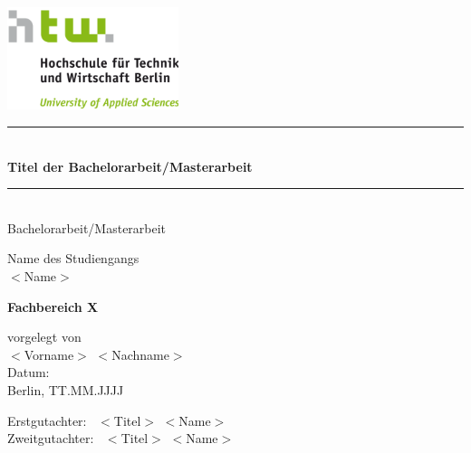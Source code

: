 \begin{center}
    \includegraphics[width=5cm, height=3cm]{images/htw_hochschule.png}
    
    \vspace*{0.7cm}
    
    \rule{\linewidth}{0.1 mm} \\[1 cm]
    
     {\LARGE \textbf{\textcolor[HTML]{70AD47} {Titel der Bachelorarbeit/Masterarbeit}}} \\ [0.5cm]
     
    \rule{\linewidth}{0.1 mm} \\[0.7 cm]
    
    {\Large Bachelorarbeit/Masterarbeit} 
    
    \vspace*{2.0cm}
    
    {\normalsize Name des Studiengangs} \\ \vspace{0.5cm} 
    {\LARGE $<$Name$>$}\\
    \vspace*{1cm}
    
    {\LARGE \textbf{\textcolor[HTML]{70AD47}{Fachbereich X}}}\\
    
    \vspace*{0.5cm}
    
    {\normalsize vorgelegt von} \\ \vspace{0.5cm}
    {\LARGE $<$Vorname$>$ $<$Nachname$>$}\\
    
    \vspace*{2cm}
    {\normalsize Datum:}\\ \vspace{0.3cm}
    {\large Berlin, TT.MM.JJJJ}\\
    
\end{center}
\vspace*{1.0cm}

\begin{center}
    {\LARGE Erstgutachter: \, }
    {\LARGE $<$Titel$>$ $<$Name$>$}\\[0.5cm]
    {\LARGE Zweitgutachter: \, }
    {\LARGE $<$Titel$>$ $<$Name$>$}
\end{center}